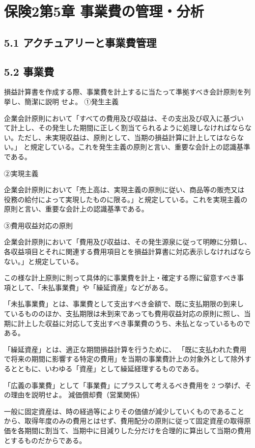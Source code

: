 \documentclass[report,gutter=10mm,fore-edge=10mm,uplatex,dvipdfmx]{jlreq}
\begin{document}
\chapter{保険2第5章 事業費の管理・分析}
\section{5.1 アクチュアリーと事業費管理}
\section{5.2 事業費}
損益計算書を作成する際、事業費を計上するに当たって準拠すべき会計原則を列挙し、簡潔に説明
せよ。
\answer{}
\noindent①発生主義

企業会計原則において「すべての費用及び収益は、その支出及び収入に基づい
て計上し、その発生した期間に正しく割当てられるように処理しなければならな
い。ただし、未実現収益は、原則として、当期の損益計算に計上してはならない。」
と規定している。これを発生主義の原則と言い、重要な会計上の認識基準である。

\noindent②実現主義

企業会計原則において「売上高は、実現主義の原則に従い、商品等の販売又は
役務の給付によって実現したものに限る。」と規定している。これを実現主義の
原則と言い、重要な会計上の認識基準である。

\noindent③費用収益対応の原則

企業会計原則において「費用及び収益は、その発生源泉に従って明瞭に分類し、
各収益項目とそれに関連する費用項目とを損益計算書に対応表示しなければなら
ない。」と規定している。

この様な計上原則に則って具体的に事業費を計上・確定する際に留意すべき事
項として、「未払事業費」や「繰延資産」などがある。

「未払事業費」とは、事業費として支出すべき金額で、既に支払期限の到来し
ているもののほか、支払期限は未到来であっても費用収益対応の原則に照し、当
期に計上した収益に対応して支出すべき事業費のうち、未払となっているもので
ある。

「繰延資産」とは、適正な期間損益計算を行うために、
「既に支払われた費用
で将来の期間に影響する特定の費用」を当期の事業費計上の対象外として除外す
るとともに、いわゆる「資産」として繰延経理するものである。

「広義の事業費」として「事業費」にプラスして考えるべき費用を 2 つ挙げ、その理由を説明せよ。
\answer{}
\noindent 減価償却費（営業関係）

一般に固定資産は、時の経過等によりその価値が減少していくものであること
から、取得年度のみの費用とはせず、費用配分の原則に従って固定資産の取得原
価を各期間に割当て、当期中に目減りした分だけを合理的に算出して当期の費用
とするものだからである。
\end{document}
